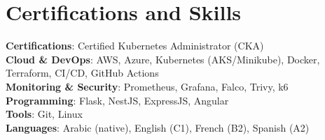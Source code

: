 \documentclass[letterpaper,11pt]{article}
\begin{document}
\section{Certifications and Skills}
 \begin{itemize}[leftmargin=0.15in, label={}]
    \small{\item{
     \textbf{Certifications}{: Certified Kubernetes Administrator (CKA)} \\
     \textbf{Cloud \& DevOps}{: AWS, Azure, Kubernetes (AKS/Minikube), Docker, Terraform, CI/CD, GitHub Actions} \\
     \textbf{Monitoring \& Security}{: Prometheus, Grafana, Falco, Trivy, k6} \\
     \textbf{Programming}{: Flask, NestJS, ExpressJS, Angular} \\
     \textbf{Tools}{: Git, Linux} \\
     \textbf{Languages}{: Arabic (native), English (C1), French (B2), Spanish (A2)}
    }}
 \end{itemize}
\end{document}
